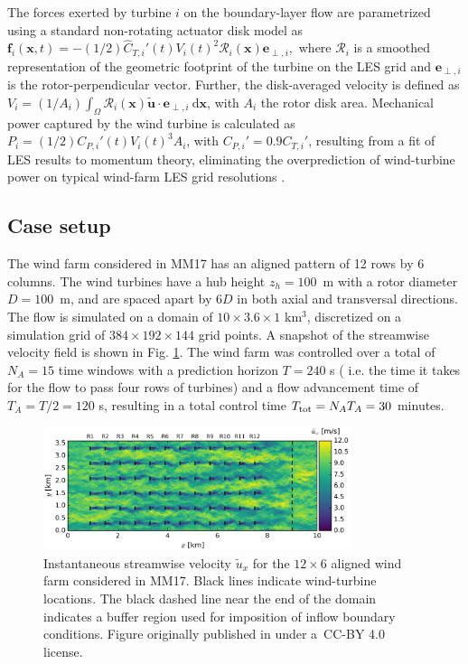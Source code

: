 \documentclass[wes, manuscript]{copernicus}
\newcommand{\revision}[1]{{\color{blue} #1}}
\begin{document}
The forces exerted by turbine $i$ on the boundary-layer flow are parametrized using a standard non-rotating actuator disk model as
$	\boldsymbol{f}_i(\boldsymbol{x},t) = - (1/2) \widehat{C}_{T,i}'(t) V_i(t)^2 \mathscr{R}_i (\boldsymbol{x}) \boldsymbol{e}_{\perp,i},$
where $\mathscr{R}_i$ is a smoothed representation of the geometric footprint of the turbine on the LES grid and $\boldsymbol{e}_{\perp,i}$ is the rotor-perpendicular vector. Further, the disk-averaged velocity is defined as $V_i = (1/A_i) \int_{\Omega} \mathscr{R}_i(\boldsymbol{x}) \widetilde{\boldsymbol{u}} \cdot \boldsymbol{e}_{\perp,i} ~\text{d}\boldsymbol{x}$, with $A_i$ the rotor disk area. Mechanical power captured by the wind turbine is calculated as $P_i = (1/2) C_{P,i}'(t) V_i(t)^3 A_i$, with $C_{P,i}' = 0.9 C_{T,i}'$, resulting from a fit of LES results to momentum theory, eliminating the overprediction of wind-turbine power on typical wind-farm LES grid resolutions \citep{munters2017optimal}.  

\subsection{Case setup}
The wind farm considered in MM17 has an aligned pattern of 12 rows by 6 columns. \revision{The wind turbines have a hub height $z_h = 100$~m with a rotor diameter $D = 100$~m, and are spaced apart by 6$D$ in both axial and transversal directions.} The flow is simulated on a domain of $10 \times 3.6 \times 1$ km$^3$, discretized on a simulation grid of $384 \times 192 \times 144$ grid points. A snapshot of the streamwise velocity field is shown in Fig. \ref{fig:flowfield_MM17}. The wind farm was controlled over a total of $N_A = 15$ time windows with a prediction horizon $T = 240$ s (\revision{i.e. the time it takes for the flow to pass four rows of turbines}) and a flow advancement time of $T_A = T/2 = 120$ s, resulting in a total control time $T_{\rm tot} = N_A T_A = 30$ minutes. 

\begin{figure}
	\includegraphics[width=0.8\textwidth]{figure2}
	\caption{Instantaneous streamwise velocity $\widetilde{u}_x$ for the $12 \times 6$ aligned wind farm considered in MM17. Black lines indicate wind-turbine locations. The black dashed line near the end of the domain indicates a buffer region used for imposition of inflow boundary conditions. Figure originally published in \cite{munters2017optimal} under a~CC-BY 4.0 license.\label{fig:flowfield_MM17}}
\end{figure}
\end{document}
